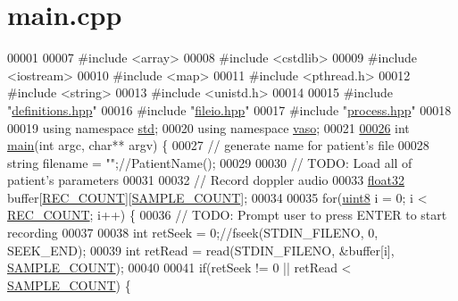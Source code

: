 \hypertarget{main_8cpp_source}{\section{main.\+cpp}
\label{main_8cpp_source}
}

\begin{DoxyCode}
00001 
00007 \textcolor{preprocessor}{#include <array>}
00008 \textcolor{preprocessor}{#include <cstdlib>}
00009 \textcolor{preprocessor}{#include <iostream>}
00010 \textcolor{preprocessor}{#include <map>}
00011 \textcolor{preprocessor}{#include <pthread.h>}
00012 \textcolor{preprocessor}{#include <string>}
00013 \textcolor{preprocessor}{#include <unistd.h>}
00014 
00015 \textcolor{preprocessor}{#include "\hyperlink{definitions_8hpp}{definitions.hpp}"}
00016 \textcolor{preprocessor}{#include "\hyperlink{fileio_8hpp}{fileio.hpp}"}
00017 \textcolor{preprocessor}{#include "\hyperlink{process_8hpp}{process.hpp}"}
00018 
00019 \textcolor{keyword}{using namespace }\hyperlink{namespacestd}{std};
00020 \textcolor{keyword}{using namespace }\hyperlink{namespacevaso}{vaso};
00021 
\hypertarget{main_8cpp_source_l00026}{}\hyperlink{main_8cpp_a3c04138a5bfe5d72780bb7e82a18e627}{00026} \textcolor{keywordtype}{int} \hyperlink{main_8cpp_a3c04138a5bfe5d72780bb7e82a18e627}{main}(\textcolor{keywordtype}{int} argc, \textcolor{keywordtype}{char}** argv) \{
00027     \textcolor{comment}{// generate name for patient's file}
00028     \textcolor{keywordtype}{string} filename = \textcolor{stringliteral}{""};\textcolor{comment}{//PatientName();}
00029 
00030     \textcolor{comment}{// TODO: Load all of patient's parameters}
00031 
00032     \textcolor{comment}{// Record doppler audio}
00033     \hyperlink{definitions_8hpp_aacdc525d6f7bddb3ae95d5c311bd06a1}{float32} buffer[\hyperlink{definitions_8hpp_aa44e6143be9e89f19be973956c22e134}{REC\_COUNT}][\hyperlink{definitions_8hpp_a1682c770d91c5d167b621a782be940d4}{SAMPLE\_COUNT}];
00034     
00035     \textcolor{keywordflow}{for}(\hyperlink{definitions_8hpp_adde6aaee8457bee49c2a92621fe22b79}{uint8} i = 0; i < \hyperlink{definitions_8hpp_aa44e6143be9e89f19be973956c22e134}{REC\_COUNT}; i++) \{
00036         \textcolor{comment}{// TODO: Prompt user to press ENTER to start recording}
00037 
00038         \textcolor{keywordtype}{int} retSeek = 0;\textcolor{comment}{//fseek(STDIN\_FILENO, 0, SEEK\_END);}
00039         \textcolor{keywordtype}{int} retRead = read(STDIN\_FILENO, &buffer[i], \hyperlink{definitions_8hpp_a1682c770d91c5d167b621a782be940d4}{SAMPLE\_COUNT});
00040 
00041         \textcolor{keywordflow}{if}(retSeek != 0 || retRead < \hyperlink{definitions_8hpp_a1682c770d91c5d167b621a782be940d4}{SAMPLE\_COUNT}) \{

\end{DoxyCode}
